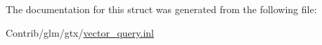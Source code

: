 The documentation for this struct was generated from the following file\+:\begin{DoxyCompactItemize}
\item 
Contrib/glm/gtx/\mbox{\hyperlink{vector__query_8inl}{vector\+\_\+query.\+inl}}\end{DoxyCompactItemize}
